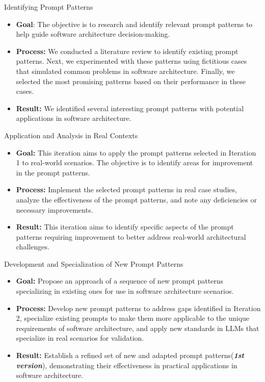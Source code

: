  Identifying Prompt Patterns

\begin{itemize}
    \item \textbf{Goal}: The objective is to research and identify relevant prompt patterns to help guide software architecture decision-making.
    \item \textbf{Process:} We conducted a literature review to identify existing prompt patterns. Next, we experimented with these patterns using fictitious cases that simulated common problems in software architecture. Finally, we selected the most promising patterns based on their performance in these cases.
    \item \textbf{Result:} We identified several interesting prompt patterns with potential applications in software architecture.
\end{itemize}

 Application and Analysis in Real Contexts
\begin{itemize}
    \item \textbf{Goal:} This iteration aims to apply the prompt patterns selected in Iteration 1 to real-world scenarios. The objective is to identify areas for improvement in the prompt patterns.
    \item \textbf{Process:} Implement the selected prompt patterns in real case studies, analyze the effectiveness of the prompt patterns, and note any deficiencies or necessary improvements.            
    \item \textbf{Result:} This iteration aims to identify specific aspects of the prompt patterns requiring improvement to better address real-world architectural challenges.
\end{itemize}

 Development and Specialization of New Prompt Patterns
\begin{itemize}
    \item \textbf{Goal:} Propose an approach of a sequence of new prompt patterns specializing in existing ones for use in software architecture scenarios.
    \item \textbf{Process:} Develop new prompt patterns to address gaps identified in Iteration 2, specialize existing prompts to make them more applicable to the unique requirements of software architecture, and apply new standards in LLMs that specialize in real scenarios for validation.        
    \item \textbf{Result:}  Establish a refined set of new and adapted prompt patterns(\textit{\textbf{1st version}}), demonstrating their effectiveness in practical applications in software architecture.
\end{itemize}


